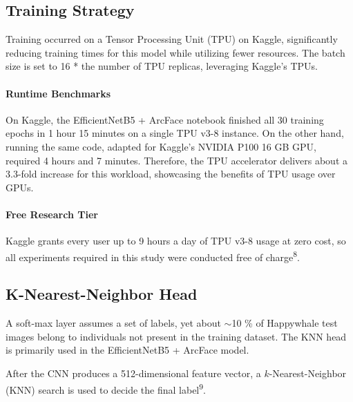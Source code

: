 \documentclass[twocolumn]{article}
\begin{document}
\subsection{Training Strategy}

Training occurred on a Tensor Processing Unit (TPU) on Kaggle, significantly reducing training times for this model while utilizing fewer resources. The batch size is set to 16 * the number of TPU replicas, leveraging Kaggle’s TPUs.

\paragraph{Runtime Benchmarks}

On Kaggle, the EfficientNetB5 + ArcFace notebook finished all 30 training epochs in 1 hour 15 minutes on a single TPU v3-8 instance.
On the other hand, running the same code, adapted for Kaggle's NVIDIA P100 16 GB GPU, required 4 hours and 7 minutes.
Therefore, the TPU accelerator delivers about a 3.3-fold increase for this workload, showcasing the benefits of  TPU usage over GPUs.

\paragraph{Free Research Tier}

Kaggle grants every user up to 9 hours a day of TPU v3-8 usage at zero cost, so all experiments required in this study were conducted free of charge\textsuperscript{8}.

\subsection{K-Nearest-Neighbor Head}

A soft-max layer assumes a set of labels, yet about $\sim$10 \% of Happywhale test images belong to individuals not present in the training dataset. The KNN head is primarily used in the EfficientNetB5 + ArcFace model.

After the CNN produces a 512-dimensional feature vector, a $k$-Nearest-Neighbor (KNN) search is used to decide the final label\textsuperscript{9}.
\end{document}
